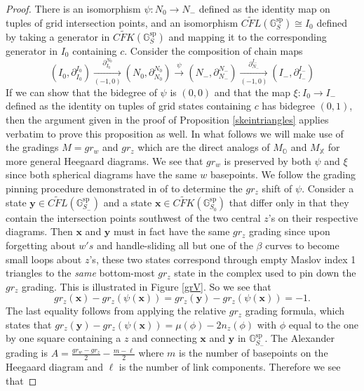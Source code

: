 \documentclass[11pt]{amsart}
\theoremstyle{definition}
\theoremstyle{remark}
\numberwithin{equation}{section}
\begin{document}
\begin{proof}
There is an isomorphism $\psi\colon N_0\to N_-$ defined as the identity map on tuples of grid intersection points, and an isomorphism $\widetilde{CFL}(\mathbb{G}_S^{\textrm{sp}})\cong I_0$ defined by taking a generator in $\widetilde{CFK}(\mathbb{G}_S^{\textrm{sp}})$ and mapping it to the corresponding generator in $I_0$ containing $c.$ Consider the composition of chain maps 
\begin{equation}
    (I_0, \partial_{I_0}^{I_0})\xrightarrow[(-1,0)]{\partial_{I_0}^{N_0}}(N_0, \partial_{N_0}^{N_0})\xrightarrow[]{\psi}(N_-, \partial_{N_-}^{N_-})\xrightarrow[(-1,0)]{\partial_{N_-}^{I_-}}(I_-, \partial_{I_-}^{I_-})
\end{equation}
    If we can show that the bidegree of $\psi$ is $(0,0)$ and that the map $\xi\colon I_0\to I_-$ defined as the identity on tuples of grid states containing $c$ has bidegree $(0,1)$, then the argument given in the proof of Proposition \ref{skeintriangles} applies verbatim to prove this proposition as well. In what follows we will make use of the gradings $M=gr_w$ and $gr_z$ which are the direct analogs of $M_{\mathbb{O}}$ and $M_{\mathbb{X}}$ for more general Heegaard diagrams. We see that $gr_w$ is preserved by both $\psi$ and $\xi$ since both spherical diagrams have the same $w$ basepoints. We follow the grading pinning procedure demonstrated in of \cite[~Lemma 3.2, Figure 8]{MOSgrids} to determine the $gr_z$ shift of $\psi$. Consider a state $\mathbf{y}\in\widetilde{CFL}(\mathbb{G}_{S_-}^{\textrm{sp}})$ and a state $\mathbf{x}\in \widetilde{CFK}(\mathbb{G}_{S_0}^{\textrm{sp}})$ that differ only in that they contain the intersection points southwest of the two central $z$'s on their respective diagrams. Then $\mathbf{x}$ and $\mathbf{y}$ must in fact have the same $gr_z$ grading since upon forgetting about $w's$ and handle-sliding all but one of the $\beta$ curves to become small loops about $z$'s, these two states correspond through empty Maslov index 1 triangles to the \emph{same} bottom-most $gr_z$ state in the complex used to pin down the $gr_z$ grading. This is illustrated in Figure \ref{grV}. So we see that \[gr_z(\mathbf{x})-gr_z(\psi(\mathbf{x}))=gr_z(\mathbf{y})-gr_z(\psi(\mathbf{x}))=-1.\]The last equality follows from applying the relative $gr_z$ grading formula, which states that $gr_z(\mathbf{y})-gr_z(\psi(\mathbf{x}))=\mu(\phi)-2n_z(\phi)$ with $\phi$ equal to the one by one square containing a $z$ and connecting $\mathbf{x}$ and $\mathbf{y}$ in $\mathbb{G}_{S_-}^{\textrm{sp}}$. The Alexander grading is $A=\frac{gr_w-gr_z}{2}-\frac{m-\ell}{2}$ where $m$ is the number of basepoints on the Heegaard diagram and $\ell$ is the number of link components. Therefore we see that


\end{proof}
\end{document}
